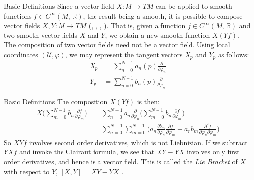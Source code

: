 \documentclass{beamer}
\begin{document}
    \begin{frame}{Basic Definitions}
        Since a vector field $X:M\rightarrow{TM}$ can be applied to smooth
        functions $f\in{C}^{\infty}(M,\,\mathbb{R})$, the result being
        a smooth, it is possible to compose vector fields
        $X,Y:M\rightarrow{TM}$
        (\cite[p.~56]{JostRiemannianGeometryAndGeometricAnalysis},
        \cite[p.~385]{LeeRiemannianManifolds},
        \cite[p.~185-186]{LeeSmoothManifolds},
        \cite[p.~13]{OneillSemiRiemannianGeometry}).
        That is, given a function
        $f\in{C}^{\infty}(M,\,\mathbb{R})$ and two smooth vector fields $X$ and
        $Y$, we obtain a new smooth function $X(Yf)$. The composition of two
        vector fields need not be a vector field. Using local
        coordinates $(\mathcal{U},\varphi)$, we may represent the tangent
        vectors $X_{p}$ and $Y_{p}$ as follows:
        \begin{align}
            X_{p}&=\sum_{n=0}^{N-1}a_{n}(p)\frac{\partial}{\partial\varphi_{n}}\\
            Y_{p}&=\sum_{n=0}^{N-1}b_{n}(p)\frac{\partial}{\partial\varphi_{n}}
        \end{align}
    \end{frame}
    \begin{frame}{Basic Definitions}
        The composition $X(Yf)$ is then:
        \begin{align}
            X\Big(
                \sum_{m=0}^{N-1}b_{n}\frac{\partial{f}}{\partial\varphi_{m}}
            \Big)
            &=\sum_{n=0}^{N-1}a_{n}\frac{\partial}{\partial\varphi_{n}}
            \Big(
                \sum_{m=0}^{N-1}b_{n}\frac{\partial{f}}{\partial\varphi_{m}}
            \Big)\\
            &=\sum_{n=0}^{N-1}\sum_{m=0}^{N-1}\Big(
                a_{n}\frac{\partial{b}_{m}}{\partial\varphi_{n}}
                \frac{\partial{f}}{\partial\varphi_{m}}+
                a_{n}b_{m}
                \frac{\partial^{2}{f}}{\partial\varphi_{n}\partial\varphi_{m}}
            \Big)
        \end{align}
        So $XYf$ involves second order derivatives, which is not Liebnizian.
        If we subtract $YXf$ and invoke the Clairaut formula, we see that
        $XY-YX$ involves only first order derivatives, and hence is a
        vector field. This is called the \textit{Lie Bracket} of $X$ with
        respect to $Y$, $[X,Y]=XY-YX$
        \cite[p.~78,\,119]{MukherjeeDifferentialTopology}.
    \end{frame}
\end{document}
